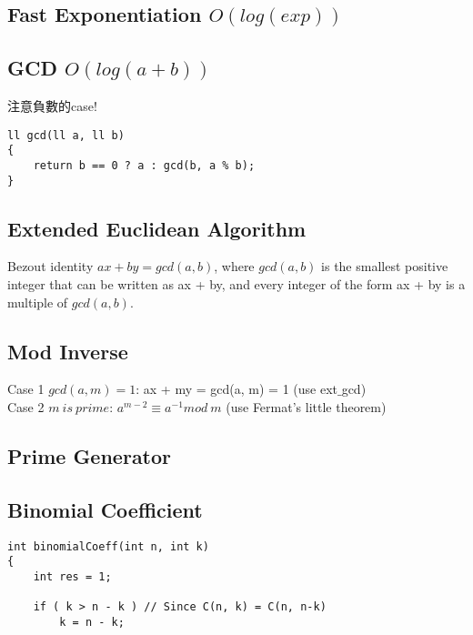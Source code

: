 \documentclass[10pt,oneside]{article}
\begin{document}
\begin{landscape}
\begin{multicols}{2}
\subsection{Fast Exponentiation $O(log(exp))$}



\subsection{GCD $O(log(a + b))$}

注意負數的case!

\begin{lstlisting}
ll gcd(ll a, ll b)
{
    return b == 0 ? a : gcd(b, a % b);
}
\end{lstlisting}

\subsection{Extended Euclidean Algorithm}

Bezout identity $ax + by = gcd(a, b)$, where $gcd(a, b)$ is the smallest positive integer that can be written as ax + by, and every integer of the form ax + by is a multiple of $gcd(a, b)$.



\subsection{Mod Inverse}

Case 1 $gcd(a, m) = 1$:  ax + my = gcd(a, m) = 1 (use ext$\_$gcd) \\

\noindent Case 2 $m\ is\ prime$: $a^{m - 2} \equiv a^{-1} mod\ m$ (use Fermat's little theorem)

\subsection{Prime Generator}


\subsection{Binomial Coefficient}

\begin{lstlisting}
int binomialCoeff(int n, int k)
{
    int res = 1;
 
    if ( k > n - k ) // Since C(n, k) = C(n, n-k)
        k = n - k;
 

\end{lstlisting}
\end{multicols}
\end{landscape}
\end{document}
